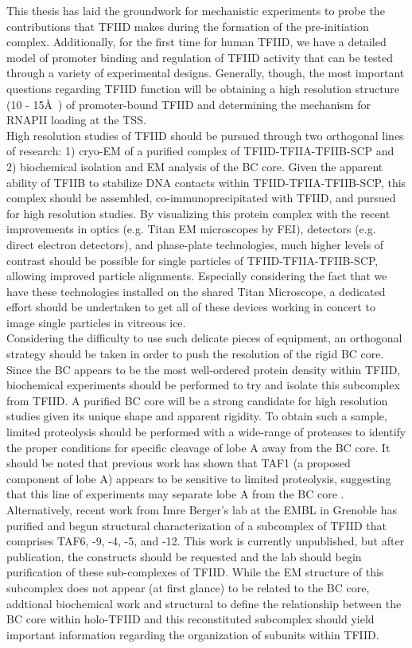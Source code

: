 \indent This thesis has laid the groundwork for mechanistic experiments to probe the contributions that TFIID makes during the formation of the pre-initiation complex. Additionally, for the first time for human TFIID, we have a detailed model of promoter binding and regulation of TFIID activity that can be tested through a variety of experimental designs. Generally, though, the most important questions regarding TFIID function will be obtaining a high resolution structure (10 - 15\AA\ ) of promoter-bound TFIID and determining the mechanism for RNAPII loading at the TSS.\\
 \indent High resolution studies of TFIID should be pursued through two orthogonal lines of research: 1) cryo-EM of a purified complex of TFIID-TFIIA-TFIIB-SCP and 2) biochemical isolation and EM analysis of the BC core. Given the apparent ability of TFIIB to stabilize DNA contacts within TFIID-TFIIA-TFIIB-SCP, this complex should be assembled, co-immunoprecipitated with TFIID, and pursued for high resolution studies. By visualizing this protein complex with the recent improvements in optics (e.g. Titan EM microscopes by FEI), detectors (e.g. direct electron detectors), and phase-plate technologies, much higher levels of contrast should be possible for single particles of TFIID-TFIIA-TFIIB-SCP, allowing improved particle alignments. Especially considering the fact that we have these technologies installed on the shared Titan Microscope, a dedicated effort should be undertaken to get all of these devices working in concert to image single particles in vitreous ice.\\
\indent Considering the difficulty to use such delicate pieces of equipment, an orthogonal strategy should be taken in order to push the resolution of the rigid BC core. Since the BC appears to be the most well-ordered protein density within TFIID, biochemical experiments should be performed to try and isolate this subcomplex from TFIID. A purified BC core will be a strong candidate for high resolution studies given its unique shape and apparent rigidity. To obtain such a sample, limited proteolysis should be performed with a wide-range of proteases to identify the proper conditions for specific cleavage of lobe A away from the BC core. It should be noted that previous work has shown that TAF1 (a proposed component of lobe A) appears to be sensitive to limited proteolysis, suggesting that this line of experiments may separate lobe A from the BC core \cite{Ozer_1998}.\\
\indent Alternatively, recent work from Imre Berger's lab at the EMBL in Grenoble has purified and begun structural characterization of a subcomplex of TFIID that comprises TAF6, -9, -4, -5, and -12. This work is currently unpublished, but after publication, the constructs should be requested and the lab should begin purification of these sub-complexes of TFIID. While the EM structure of this subcomplex does not appear (at first glance) to be related to the BC core, addtional biochemical work and structural to define the relationship between the BC core within holo-TFIID and this reconstituted subcomplex should yield important information regarding the organization of subunits within TFIID.\\
